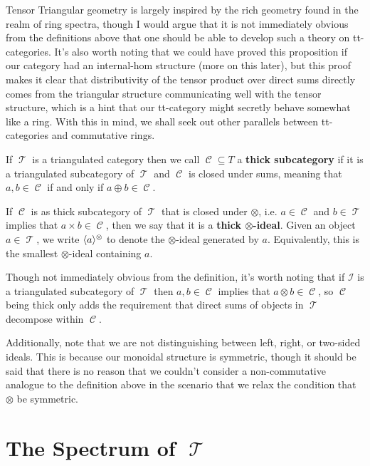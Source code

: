 \documentclass[11pt]{article}
\DeclareMathOperator{\CC}{\mathcal{C}}
\DeclareMathOperator{\TT}{\mathcal{T}}
\begin{document}
\begin{rmk}
Tensor Triangular geometry is largely inspired by the rich geometry found in the realm of ring spectra, though I would argue that it is not immediately obvious from the definitions above that one should be able to develop such a theory on tt-categories. It's also worth noting that we could have proved this proposition if our category had an internal-hom structure (more on this later), but this proof makes it clear that distributivity of the tensor product over direct sums directly comes from the triangular structure communicating well with the tensor structure, which is a hint that our tt-category might secretly behave somewhat like a ring. With this in mind, we shall seek out other parallels between tt-categories and commutative rings.
\end{rmk}

\begin{defn}
If $\TT$ is a triangulated category then we call $\CC \subseteq T$ a \textbf{thick subcategory} if it is a triangulated subcategory of $\TT$ and $\CC$ is closed under sums, meaning that $a,b \in \CC$ if and only if $a \oplus b \in \CC$.

If $\CC$ is as thick subcategory of $\TT$ that is closed under $\otimes$, i.e. $a \in \CC$ and $b \in \TT$ implies that $a \times b \in \CC$, then we say that it is a \textbf{thick $\otimes$-ideal}. Given an object $a \in \TT$, we write $\langle a \rangle^\otimes$ to denote the $\otimes$-ideal generated by $a$. Equivalently, this is the smallest $\otimes$-ideal containing $a$.
\end{defn}

\begin{rmk}
Though not immediately obvious from the definition, it's worth noting that if $\mathcal{I}$ is a triangulated subcategory of $\TT$ then $a,b \in \CC$ implies that $a \otimes b \in \CC$, so $\CC$ being thick only adds the requirement that direct sums of objects in $\TT$ decompose within $\CC$.

Additionally, note that we are not distinguishing between left, right, or two-sided ideals. This is because our monoidal structure is symmetric, though it should be said that there is no reason that we couldn't consider a non-commutative analogue to the definition above in the scenario that we relax the condition that $\otimes$ be symmetric.
\end{rmk}

\newpage

\section{The Spectrum of \texorpdfstring{$\TT$}{𝓣}}
\end{document}
